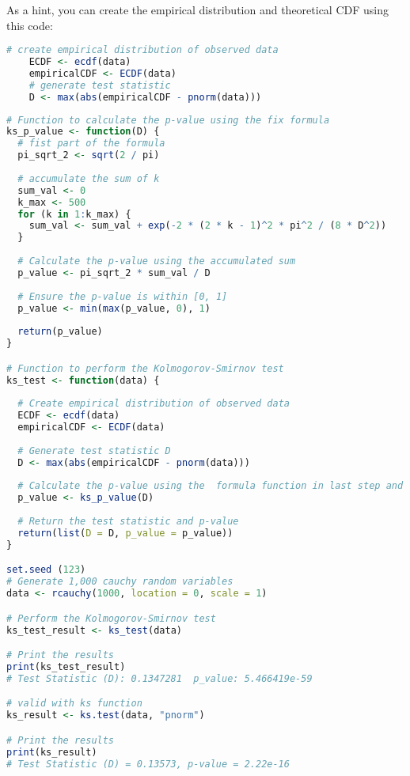 \documentclass[12pt,letterpaper]{article}
\begin{document}
	
\noindent As a hint, you can create the empirical distribution and theoretical CDF using this code:

\begin{lstlisting}[language=R]
	# create empirical distribution of observed data
	ECDF <- ecdf(data)
	empiricalCDF <- ECDF(data)
	# generate test statistic
	D <- max(abs(empiricalCDF - pnorm(data))) \end{lstlisting}

\vspace{2cm}
\begin{lstlisting}[language=R]
# Function to calculate the p-value using the fix formula
ks_p_value <- function(D) {
  # fist part of the formula
  pi_sqrt_2 <- sqrt(2 / pi) 
  
  # accumulate the sum of k
  sum_val <- 0
  k_max <- 500
  for (k in 1:k_max) {
    sum_val <- sum_val + exp(-2 * (2 * k - 1)^2 * pi^2 / (8 * D^2))
  }
  
  # Calculate the p-value using the accumulated sum
  p_value <- pi_sqrt_2 * sum_val / D  
  
  # Ensure the p-value is within [0, 1]
  p_value <- min(max(p_value, 0), 1)
  
  return(p_value)
}

# Function to perform the Kolmogorov-Smirnov test
ks_test <- function(data) {
  
  # Create empirical distribution of observed data
  ECDF <- ecdf(data)
  empiricalCDF <- ECDF(data)
  
  # Generate test statistic D
  D <- max(abs(empiricalCDF - pnorm(data)))
  
  # Calculate the p-value using the  formula function in last step and D
  p_value <- ks_p_value(D)  
  
  # Return the test statistic and p-value
  return(list(D = D, p_value = p_value))
}

set.seed (123)
# Generate 1,000 cauchy random variables
data <- rcauchy(1000, location = 0, scale = 1)

# Perform the Kolmogorov-Smirnov test
ks_test_result <- ks_test(data)

# Print the results
print(ks_test_result)
# Test Statistic (D): 0.1347281  p_value: 5.466419e-59

# valid with ks function
ks_result <- ks.test(data, "pnorm")

# Print the results
print(ks_result)
# Test Statistic (D) = 0.13573, p-value = 2.22e-16
\end{lstlisting}
\end{document}
